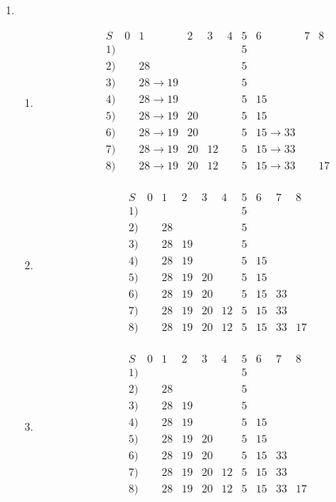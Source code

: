 \documentclass[a4paper,11pt]{article}             %
\begin{document}
\begin{enumerate}
\item
\begin{enumerate}
\item
\begin{equation*}
\begin{array}{c|ccccccccc}
S  &0&1&2&3&4&5&6&7&8\\
\hline
1) & & & & & &5& & & \\
2) & &28& & & &5& & & \\
3) & &28\rightarrow 19& & & &5& & & \\
4) & &28\rightarrow 19& & & &5&15& & \\
5) & &28\rightarrow 19&20& & &5&15& & \\
6) & &28\rightarrow 19&20& & &5&15\rightarrow 33& & \\
7) & &28\rightarrow 19&20&12& &5&15\rightarrow 33& & \\
8) & &28\rightarrow 19&20&12& &5&15\rightarrow 33& &17\\
\end{array}
\end{equation*}

\item
\begin{equation*}
\begin{array}{c|ccccccccc}
S  &0&1&2&3&4&5&6&7&8\\
\hline
1) & & & & & &5& & & \\
2) & &28& & & &5& & & \\
3) & &28&19& & &5& & & \\
4) & &28&19& & &5&15& & \\
5) & &28&19&20& &5&15& & \\
6) & &28&19&20& &5&15&33& \\
7) & &28&19&20&12&5&15&33& \\
8) & &28&19&20&12&5&15&33&17\\
\end{array}
\end{equation*}

\item
\begin{equation*}
\begin{array}{c|ccccccccc}
S  &0&1&2&3&4&5&6&7&8\\
\hline
1) & & & & & &5& & & \\
2) & &28& & & &5& & & \\
3) & &28&19& & &5& & & \\
4) & &28&19& & &5&15& & \\
5) & &28&19&20& &5&15& & \\
6) & &28&19&20& &5&15&33& \\
7) & &28&19&20&12&5&15&33& \\
8) & &28&19&20&12&5&15&33&17\\
\end{array}
\end{equation*}


\end{enumerate}
\end{enumerate}
\end{document}
